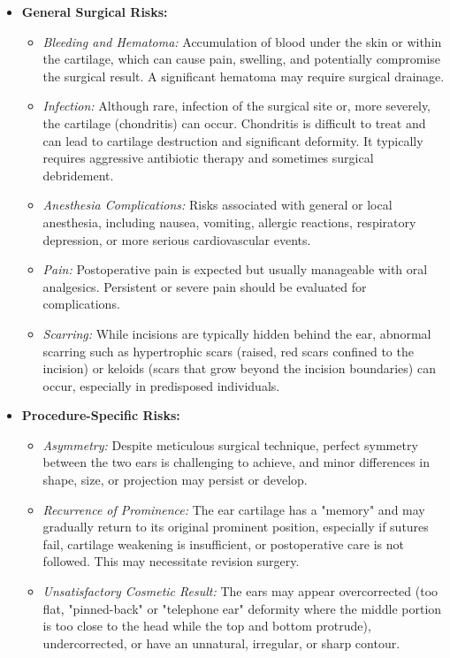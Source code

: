 \begin{itemize}
  \item \textbf{General Surgical Risks:}
    \begin{itemize}
      \item \textit{Bleeding and Hematoma:} Accumulation of blood under the skin or within the cartilage, which can cause pain, swelling, and potentially compromise the surgical result. A significant hematoma may require surgical drainage.
      \item \textit{Infection:} Although rare, infection of the surgical site or, more severely, the cartilage (chondritis) can occur. Chondritis is difficult to treat and can lead to cartilage destruction and significant deformity. It typically requires aggressive antibiotic therapy and sometimes surgical debridement.
      \item \textit{Anesthesia Complications:} Risks associated with general or local anesthesia, including nausea, vomiting, allergic reactions, respiratory depression, or more serious cardiovascular events.
      \item \textit{Pain:} Postoperative pain is expected but usually manageable with oral analgesics. Persistent or severe pain should be evaluated for complications.
      \item \textit{Scarring:} While incisions are typically hidden behind the ear, abnormal scarring such as hypertrophic scars (raised, red scars confined to the incision) or keloids (scars that grow beyond the incision boundaries) can occur, especially in predisposed individuals.
    \end{itemize}
  \item \textbf{Procedure-Specific Risks:}
    \begin{itemize}
      \item \textit{Asymmetry:} Despite meticulous surgical technique, perfect symmetry between the two ears is challenging to achieve, and minor differences in shape, size, or projection may persist or develop.
      \item \textit{Recurrence of Prominence:} The ear cartilage has a "memory" and may gradually return to its original prominent position, especially if sutures fail, cartilage weakening is insufficient, or postoperative care is not followed. This may necessitate revision surgery.
      \item \textit{Unsatisfactory Cosmetic Result:} The ears may appear overcorrected (too flat, "pinned-back" or "telephone ear" deformity where the middle portion is too close to the head while the top and bottom protrude), undercorrected, or have an unnatural, irregular, or sharp contour.

\end{itemize}
\end{itemize}
